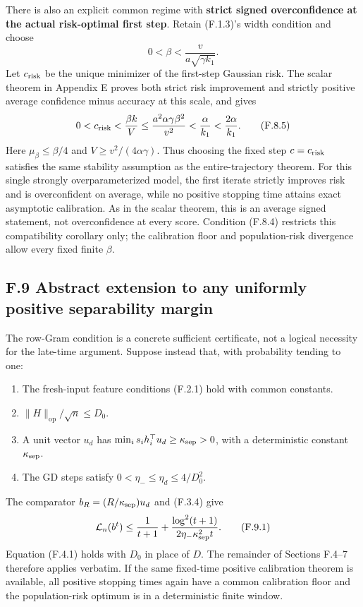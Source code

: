 \documentclass[
  11pt,
  a4paper,
]{article}
\providecommand{\tightlist}{%
  \setlength{\itemsep}{0pt}\setlength{\parskip}{0pt}}
\begin{document}
There is also an explicit common regime with \textbf{strict signed
overconfidence at the actual risk-optimal first step}. Retain (F.1.3)'s
width condition and choose \[
0<\beta<\frac{v}{a\sqrt{\gamma k_1}}.
\tag{F.8.4}
\] Let \(c_{\rm risk}\) be the unique minimizer of the first-step
Gaussian risk. The scalar theorem in Appendix E proves both strict risk
improvement and strictly positive average confidence minus accuracy at
this scale, and gives \[
0<c_{\rm risk}<\frac{\beta k}{V}
\le\frac{a^2\alpha\gamma\beta^2}{v^2}
<\frac{\alpha}{k_1}<\frac{2\alpha}{k_1}.
\tag{F.8.5}
\] Here \(\mu_\beta\le\beta/4\) and \(V\ge v^2/(4\alpha\gamma)\). Thus
choosing the fixed step \(c=c_{\rm risk}\) satisfies the same stability
assumption as the entire-trajectory theorem. For this single strongly
overparameterized model, the first iterate strictly improves risk and is
overconfident on average, while no positive stopping time attains exact
asymptotic calibration. As in the scalar theorem, this is an average
signed statement, not overconfidence at every score. Condition (F.8.4)
restricts this compatibility corollary only; the calibration floor and
population-risk divergence allow every fixed finite \(\beta\).

\hypertarget{f.9-abstract-extension-to-any-uniformly-positive-separability-margin}{%
\subsection{F.9 Abstract extension to any uniformly positive
separability
margin}\label{f.9-abstract-extension-to-any-uniformly-positive-separability-margin}}

The row-Gram condition is a concrete sufficient certificate, not a
logical necessity for the late-time argument. Suppose instead that, with
probability tending to one:

\begin{enumerate}
\def\labelenumi{\arabic{enumi}.}
\tightlist
\item
  The fresh-input feature conditions (F.2.1) hold with common constants.
\item
  \(\|H\|_{\mathrm{op}}/\sqrt n\le D_0\).
\item
  A unit vector \(u_d\) has
  \(\min_i s_i h_i^\top u_d\ge\kappa_{\rm sep}>0\), with a deterministic
  constant \(\kappa_{\rm sep}\).
\item
  The GD steps satisfy \(0<\eta_-\le\eta_d\le4/D_0^2\).
\end{enumerate}

The comparator \(b_R=(R/\kappa_{\rm sep})u_d\) and (F.3.4) give \[
\mathcal L_n(b^t)
\le\frac1{t+1}+\frac{\log^2(t+1)}{2\eta_-\kappa_{\rm sep}^2t}.
\tag{F.9.1}
\] Equation (F.4.1) holds with \(D_0\) in place of \(D\). The remainder
of Sections F.4--7 therefore applies verbatim. If the same fixed-time
positive calibration theorem is available, all positive stopping times
again have a common calibration floor and the population-risk optimum is
in a deterministic finite window.
\end{document}
